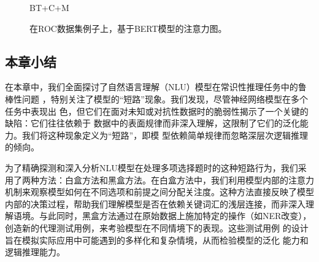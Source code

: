 \begin{figure}[h!]
\begin{minipage}{0.45\linewidth}
        \caption*{BT+C+M}
        \label{fig3:roc_cm}
    \end{minipage}
    \caption{在ROC数据集例子上，基于BERT模型的注意力图。}
    \label{fig3:roc_bert}
    \end{figure}

\subsection{本章小结}
在本章中，我们全面探讨了自然语言理解（NLU）模型在常识性推理任务中的鲁棒性问题
，特别关注了模型的``短路''现象。我们发现，尽管神经网络模型在多个任务中表现出
色，但它们在面对未知或对抗性数据时的脆弱性揭示了一个关键的缺陷：它们往往依赖于
数据中的表面规律而非深入理解，这限制了它们的泛化能力。我们将这种现象定义为``短路''，即模
型依赖简单规律而忽略深层次逻辑推理的倾向。

为了精确探测和深入分析NLU模型在处理多项选择题时的这种短路行为，我们采用了两种方法：白盒方法和黑盒方法。在白盒方法中，我们利用模型内部的注意力机制来观察模型如何在不同选项和前提之间分配关注度。这种方法直接反映了模型内部的决策过程，帮助我们理解模型是否在依赖关键词汇的浅层连接，而非深入理解语境。与此同时，黑盒方法通过在原始数据上施加特定的操作（如NER改变），
创造新的代理测试用例，来考验模型在不同情境下的表现。这些测试用例
的设计旨在模拟实际应用中可能遇到的多样化和复杂情境，从而检验模型的泛化
能力和逻辑推理能力。

